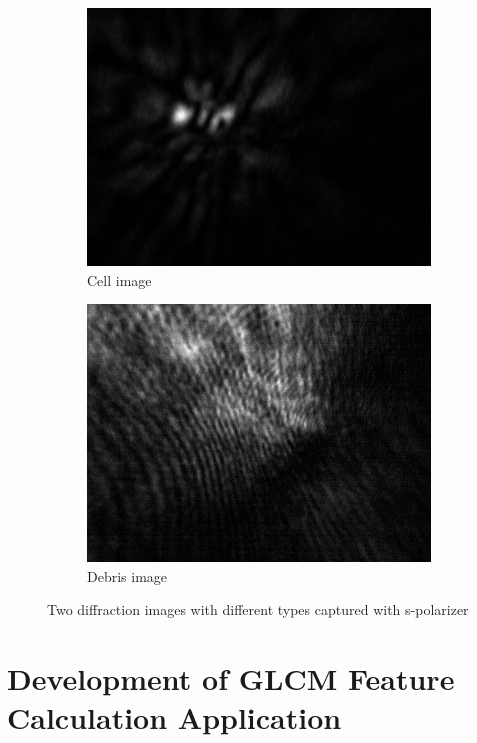 \begin{figure}[!t]
\centering
  \begin{subfigure}[b]{0.4\textwidth}
    \includegraphics[width=\textwidth]{diffraction_image/2015040117594700116-2}
    \caption{Cell image}
  \end{subfigure}
  \begin{subfigure}[b]{0.4\textwidth}
    \includegraphics[width=\textwidth]{diffraction_image/2015040117594700009-2}
    \caption{Debris image}
  \end{subfigure}
  \caption{Two diffraction images with different types captured with s-polarizer}
\end{figure}
\section{Development of GLCM Feature Calculation Application}
